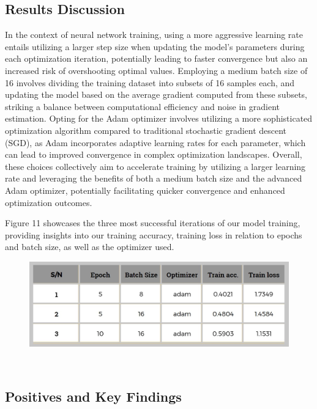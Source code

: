 \documentclass[12pt,a4paper]{article}
\begin{document}
\subsection{Results Discussion}

In the context of neural network training, using a more aggressive learning rate entails utilizing a larger step size when updating the model's parameters during each optimization iteration, potentially leading to faster convergence but also an increased risk of overshooting optimal values. Employing a medium batch size of 16 involves dividing the training dataset into subsets of 16 samples each, and updating the model based on the average gradient computed from these subsets, striking a balance between computational efficiency and noise in gradient estimation. Opting for the Adam optimizer involves utilizing a more sophisticated optimization algorithm compared to traditional stochastic gradient descent (SGD), as Adam incorporates adaptive learning rates for each parameter, which can lead to improved convergence in complex optimization landscapes. Overall, these choices collectively aim to accelerate training by utilizing a larger learning rate and leveraging the benefits of both a medium batch size and the advanced Adam optimizer, potentially facilitating quicker convergence and enhanced optimization outcomes.
\linebreak

Figure 11 showcases the three most successful iterations of our model training, providing insights into our training accuracy, training loss in relation to epochs and batch size, as well as the optimizer used.

\begin{figure}[h]
    \centering
    \includegraphics[width=\linewidth]{images/4.1.1.jpeg}
     
     
     \caption{}     \label{fig:my_label} 
    \end{figure}\\

\subsection{Positives and Key Findings}
\end{document}
